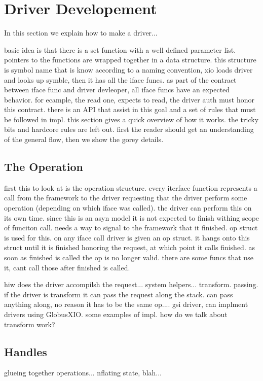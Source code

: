 \documentclass[11pt]{article}
\begin{document}
\section{Driver Developement}
In this section we explain how to make a driver...

basic idea is that there is a set function with a well defined parameter
list.  pointers to the functions are wrapped together in a data structure.
this structure is symbol name that is know according to a naming convention,
xio loads driver and looks up symble, then it has all the iface funcs.
as part of the contract between iface func and driver devleoper, all iface
funcs have an expected behavior.  for ecample, the read one, expects to read,
the driver auth must honor this contract.  there is an API that assist in this
goal and a set of rules that must be followed in impl.  this section
gives a quick overview of how it works.  the tricky bits and hardcore 
rules are left out.  first the reader should get an understanding of 
the general flow, then we show the gorey details.

\subsection{The Operation}
first this to look at is the operation structure.  every iterface function
represents a call from the framework to the driver requesting that the 
driver perform some operation (depending on which iface was called).  the 
driver can perform this on its own time.  since this is an asyn model it 
is not expected to finish withing scope of funciton call.  needs a way to 
signal to the framework that it finished.  op struct is used for this.
on any iface call driver is given an op struct.  it hangs onto this
struct until it is finished honoring the request, at which point it calls
finished.  as soon as finished is called the op is no longer valid.  there
are some funcs that use it, cant call those after finished is called.

hiw does the driver accompilsh the request... system helpers... transform.
passing.  if the driver is transform it can pass the request along the stack.
can pass anything along, no reason it has to be the same op.... gsi driver,
can implment drivers using GlobusXIO.  some examples of impl.  
how do we talk about transform work?

\subsection{Handles}
glueing together operations... nflating state, blah...
\end{document}
